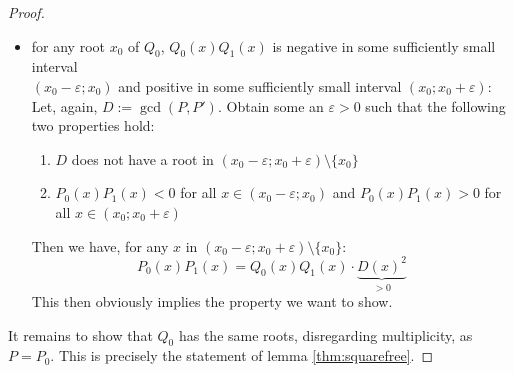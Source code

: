\documentclass[11pt,a4paper,oneside]{article}
\renewcommand{\epsilon}{\varepsilon}
\begin{document}
\begin{proof}
\begin{itemize}
\newpage
\item for any root $x_0$ of $Q_0$, $Q_0(x)Q_1(x)$ is negative in some sufficiently small interval\\ \mbox{$(x_0-\epsilon;x_0)$} and positive in some sufficiently small interval $(x_0;x_0+\epsilon)$:\\
Let, again, $D:=\gcd(P, P')$. Obtain some an $\epsilon>0$ such that the following two properties hold:
\begin{enumerate}
\item $D$ does not have a root in $(x_0-\epsilon; x_0+\epsilon)\setminus\{x_0\}$
\item $P_0(x)P_1(x)<0$ for all $x\in (x_0-\epsilon; x_0)$ and $P_0(x)P_1(x)>0$ for all $x\in (x_0;x_0+\epsilon)$ %
\end{enumerate}
Then we have, for any $x$ in $(x_0-\epsilon; x_0+\epsilon)\setminus\{x_0\}$:
$$P_0(x)P_1(x) = Q_0(x)Q_1(x)\cdot \underbrace{D(x)^2}_{>0}$$
This then obviously implies the property we want to show.
\end{itemize}
\vskip3mm
It remains to show that $Q_0$ has the same roots, disregarding multiplicity, as $P = P_0$. This is precisely the statement of lemma \ref{thm:squarefree}.
\end{proof}\vskip10mm
\end{document}
